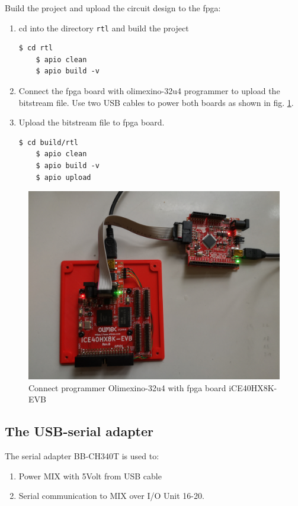\documentclass[a4paper,ngerman]{scrartcl}
\begin{document}
Build the project and upload the circuit design to the fpga:

\begin{enumerate}
	\item cd into the directory \lstinline|rtl| and build the project

	\begin{lstlisting}[numbers=none,frame=none]
	$ cd rtl
	$ apio clean
	$ apio build -v
	\end{lstlisting}
	
	\item Connect the fpga board with olimexino-32u4 programmer to upload the bitstream file. Use two USB cables to power both boards as shown in fig. \ref{fig:flash}.
	
	\item Upload the bitstream file to fpga board.
	
	\begin{lstlisting}[numbers=none,frame=none]
	$ cd build/rtl
	$ apio clean
	$ apio build -v
	$ apio upload
	\end{lstlisting}
\end{enumerate}



\begin{figure}
	\centering
	\includegraphics[width=0.6\linewidth]{MIX_flash.jpg}
	\caption{Connect programmer Olimexino-32u4 with fpga board iCE40HX8K-EVB}
	\label{fig:flash}
\end{figure}




\subsection{The USB-serial adapter}
The serial adapter BB-CH340T is used to:
\begin{enumerate}
	\item  Power MIX with 5Volt from USB cable
	\item  Serial communication to MIX over I/O Unit 16-20.
\end{enumerate}
\end{document}
